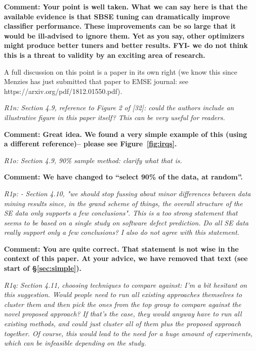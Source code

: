 \documentclass[preprint,10pt]{elsarticle}
\begin{document}
{\bf Comment: Your point is well taken. What we can say here is that the available evidence is that SBSE
tuning can dramatically improve classifier performance. These improvements can be so large that it
would be ill-advised to ignore them. Yet as you say, other optimizers might produce better tuners and better results. FYI- we do not think this is a threat to validity by an exciting area of research. 

A full discussion on this point is a paper in its own right
(we know this since Menzies has just submitted that paper to EMSE journal: \newline see https://arxiv.org/pdf/1812.01550.pdf).  
}


{\em R1n: Section 4.9, reference to Figure 2 of [32]: could the authors include an illustrative figure in this paper itself? This can be very useful for readers.}

{\bf Comment: Great idea. We found  a very simple example of this (using a different reference)--  please see Figure~\ref{fig:irqs}.}


{\em R1o:  Section 4.9, 90\% sample method: clarify what that is.}

{\bf Comment:   We have changed to
``select
 90\% of the data, at random''.}


{\em R1p: - Section 4.10, "we should stop fussing about minor differences between data mining results since, in the grand scheme of things, the overall structure of the SE data only supports a few conclusions". This is a too strong statement that seems to be based on a single study on software defect prediction. Do all SE data really support only a few conclusions? I also do not agree with this statement.}

{\bf Comment:   You are quite correct. That statement is not wise in the context
of this paper. At your advice, we have removed that text (see start of \S\vref{sec:simple}).
}

{\em R1q:  Section 4.11, choosing techniques to compare against: I'm a bit hesitant on this suggestion. Would people need to run all existing approaches themselves to cluster them and then pick the ones from the top group to compare against the novel proposed approach? If that's the case, they would anyway have to run all existing methods, and could just cluster all of them plus the proposed approach together. Of course, this would lead to the need for a huge amount of experiments, which can be infeasible depending on the study.}
\end{document}
